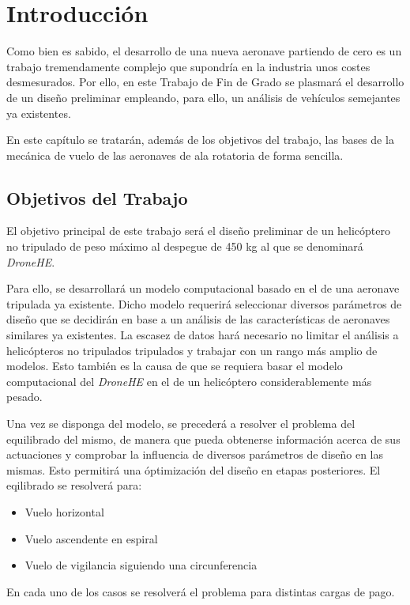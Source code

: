 \thispagestyle{empty}
\chapter{Introducción}


Como bien es sabido, el desarrollo de una nueva aeronave partiendo de cero es un trabajo tremendamente complejo que supondría en la industria unos costes desmesurados. Por ello, en este Trabajo de Fin de Grado se plasmará el desarrollo de un diseño preliminar empleando, para ello, un análisis de vehículos semejantes ya existentes.

En este capítulo se tratarán, además de los objetivos del trabajo, las bases de la mecánica de vuelo de las aeronaves de ala rotatoria de forma sencilla.

\section{Objetivos del Trabajo}

El objetivo principal de este trabajo será el diseño preliminar de un helicóptero no tripulado de peso máximo al despegue de 450 kg al que se denominará \emph{DroneHE}.

Para ello, se desarrollará un modelo computacional basado en el de una aeronave tripulada ya existente. Dicho modelo requerirá seleccionar diversos parámetros de diseño que se decidirán en base a un análisis de las características de aeronaves similares ya existentes. La escasez de datos hará necesario no limitar el análisis a helicópteros no tripulados tripulados y trabajar con un rango más amplio de modelos. Esto también es la causa de que se requiera basar el modelo computacional del \emph{DroneHE} en el de un helicóptero considerablemente más pesado.

Una vez se disponga del modelo, se precederá a resolver el problema del equilibrado del mismo, de manera que pueda obtenerse información acerca de sus actuaciones y comprobar la influencia de diversos parámetros de diseño en las mismas. Esto permitirá una óptimización del diseño en etapas posteriores. El eqilibrado se resolverá para:
\begin{itemize}
	\item Vuelo horizontal
	\item Vuelo ascendente en espiral
	\item Vuelo de vigilancia siguiendo una circunferencia
\end{itemize}
En cada uno de los casos se resolverá el problema para distintas cargas de pago.

